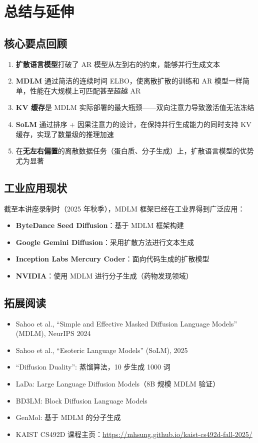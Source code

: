 \section{总结与延伸}

\subsection{核心要点回顾}

\begin{enumerate}
    \item \textbf{扩散语言模型}打破了 AR 模型从左到右的约束，能够并行生成文本
    \item \textbf{MDLM} 通过简洁的连续时间 ELBO，使离散扩散的训练和 AR 模型一样简单，性能在大规模上可匹配甚至超越 AR
    \item \textbf{KV 缓存}是 MDLM 实际部署的最大瓶颈——双向注意力导致激活值无法冻结
    \item \textbf{SoLM} 通过排序 + 因果注意力的设计，在保持并行生成能力的同时支持 KV 缓存，实现了数量级的推理加速
    \item 在\textbf{无左右偏置}的离散数据任务（蛋白质、分子生成）上，扩散语言模型的优势尤为显著
\end{enumerate}

\subsection{工业应用现状}

截至本讲座录制时（2025 年秋季），MDLM 框架已经在工业界得到广泛应用：

\begin{itemize}
    \item \textbf{ByteDance Seed Diffusion}：基于 MDLM 框架构建
    \item \textbf{Google Gemini Diffusion}：采用扩散方法进行文本生成
    \item \textbf{Inception Labs Mercury Coder}：面向代码生成的扩散模型
    \item \textbf{NVIDIA}：使用 MDLM 进行分子生成（药物发现领域）
\end{itemize}

\subsection{拓展阅读}

\begin{itemize}
    \item Sahoo et al., ``Simple and Effective Masked Diffusion Language Models'' (MDLM), NeurIPS 2024
    \item Sahoo et al., ``Esoteric Language Models'' (SoLM), 2025
    \item ``Diffusion Duality'': 蒸馏算法，10 步生成 1000 词
    \item LaDa: Large Language Diffusion Models（8B 规模 MDLM 验证）
    \item BD3LM: Block Diffusion Language Models
    \item GenMol: 基于 MDLM 的分子生成
    \item KAIST CS492D 课程主页：\url{https://mhsung.github.io/kaist-cs492d-fall-2025/}
\end{itemize}



